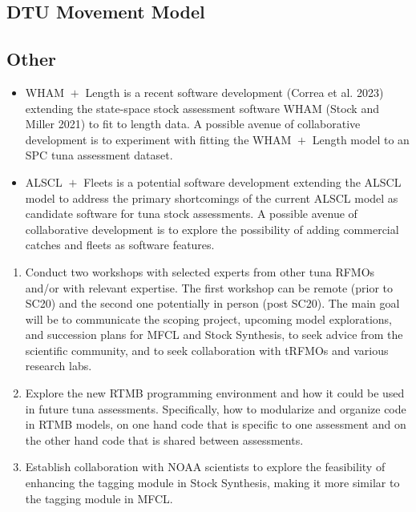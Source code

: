 \documentclass{SCreport}
\begin{document}
\subsection{DTU Movement Model}

\subsection{Other}

\begin{itemize}
  \item WHAM $\!+\!$ Length is a recent software development (Correa et al.
  2023) extending the state-space stock assessment software WHAM (Stock and
  Miller 2021) to fit to length data. A possible avenue of collaborative
  development is to experiment with fitting the WHAM $\!+\!$ Length model to an
  SPC tuna assessment dataset.
  \item ALSCL $\!+\!$ Fleets is a potential software development extending the
  ALSCL model to address the primary shortcomings of the current ALSCL model as
  candidate software for tuna stock assessments. A possible avenue of
  collaborative development is to explore the possibility of adding commercial
  catches and fleets as software features.
\end{itemize}



\begin{enumerate}
  \item Conduct two workshops with selected experts from other tuna RFMOs and/or
  with relevant expertise. The first workshop can be remote (prior to SC20) and
  the second one potentially in person (post SC20). The main goal will be to
  communicate the scoping project, upcoming model explorations, and succession
  plans for MFCL and Stock Synthesis, to seek advice from the scientific
  community, and to seek collaboration with tRFMOs and various research labs.
  \item Explore the new RTMB programming environment and how it could be used in
  future tuna assessments. Specifically, how to modularize and organize code in
  RTMB models, on one hand code that is specific to one assessment and on the
  other hand code that is shared between assessments.
  \item Establish collaboration with NOAA scientists to explore the feasibility
  of enhancing the tagging module in Stock Synthesis, making it more similar to
  the tagging module in MFCL.
\end{enumerate}
\end{document}
